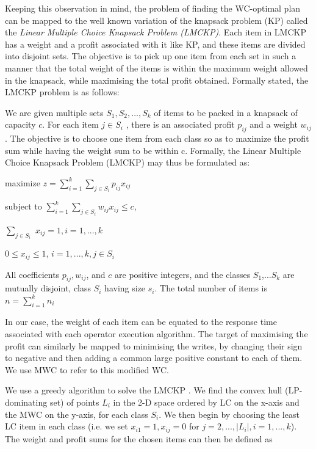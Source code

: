 \documentclass[10pt]{article}
\begin{document}
Keeping this observation in mind,
the problem of finding the WC-optimal plan can be mapped to the well known variation of the knapsack problem (KP) called the \emph{Linear Multiple Choice Knapsack Problem (LMCKP)}. Each item in LMCKP has a weight and a profit associated with it like KP, and these items are divided into disjoint sets. The objective is to pick up one item from each set in such a manner that the total weight of the items is within the maximum weight allowed in the knapsack, while maximising the total profit obtained. Formally stated, the LMCKP problem is as follows:

We are given multiple sets $S_1, S_2,..., S_k$ of items to be packed in a knapsack of capacity $c$. For each item $j \in S_i$ , there is an associated profit $p_{ij}$ and a weight $w_{ij}$. The objective is to choose one item from each class so as to maximize the profit sum while having the weight sum to be within c. Formally, the Linear Multiple Choice Knapsack Problem (LMCKP) may thus be formulated as:

maximize $z = \sum\limits_{i=1}^{k} \sum\limits_{j \in S_i}p_{ij} x_{ij}$

subject to $\sum\limits_{i=1}^{k} \sum\limits_{j \in S_i}w_{ij}  x_{ij} \le c$,

$\sum\limits_{j \in S_i}$    $ x_{ij} = 1, i = 1,...,k$

$0 \le x_{ij} \le 1$, $i = 1,...,k, j \in S_i$

All coefficients $p_{ij}, w_{ij}$, and $c$ are positive integers, and the classes $S_1$,...$S_k$ are mutually disjoint, class $S_i$ having size $s_i$. The total number of items is $n = \sum\limits_{i=1}^{k} n_i$


In our case, the weight of each item can be equated to the response time associated with each operator execution algorithm. The target of maximising the profit can similarly be mapped to minimising the writes, by changing their sign to negative and then adding a common large positive constant to each of them. We use MWC to refer to this modified WC.

We use a greedy algorithm to solve the LMCKP \cite{lmckp}.
We find the convex hull (LP-dominating set) of points $L_i$ in the 2-D space ordered by LC on the x-axis and the MWC on the y-axis, for each class $S_i$. We then begin by choosing the least LC item in each class (i.e. we set $x_{i1} = 1, x_{ij} = 0$ for $j=2,...,|L_i|, i = 1,...,k$). The weight and profit sums for the chosen items can then be defined as 
\end{document}
